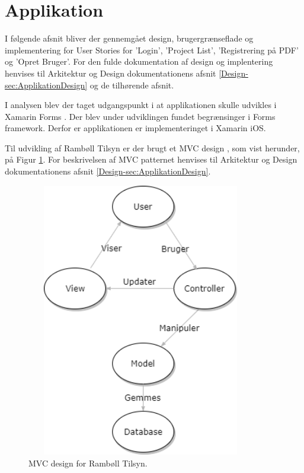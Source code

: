 \section{Applikation}
I følgende afsnit bliver der gennemgået design, brugergrænseflade og implementering for User Stories for 'Login', 'Project List', 'Registrering på PDF' og 'Opret Bruger'. For den fulde dokumentation af design og implentering henvises til Arkitektur og Design dokumentationens afsnit \ref{Design-sec:ApplikationDesign} og de tilhørende afsnit.

I analysen blev der taget udgangspunkt i at applikationen skulle udvikles i Xamarin Forms \cite{Forms}. Der blev under udviklingen fundet begrænsinger i Forms framework. Derfor er applikationen er implementeringet i Xamarin iOS.

Til udvikling af Rambøll Tilsyn er der brugt et MVC design \cite{MVC}, som vist herunder, på Figur \ref{fig:MVC}. For beskrivelsen af MVC patternet henvises til Arkitektur og Design dokumentationens afsnit \ref{Design-sec:ApplikationDesign}.
\begin{figure}[H] %
	\centering
	\includegraphics[height=12cm, width=10cm]{Design/Applikation/MVC}
	\caption{MVC design for Rambøll Tilsyn.}
	\label{fig:MVC}
\end{figure}

\clearpage





